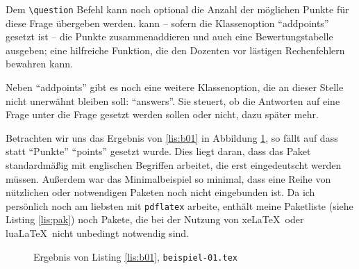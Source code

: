Dem  \texttt{\textbackslash question} Befehl kann noch optional die Anzahl der möglichen Punkte für diese Frage übergeben werden. 
 kann -- sofern die Klassenoption \enquote{addpoints} gesetzt ist -- die Punkte zusammenaddieren und auch eine Bewertungstabelle ausgeben; eine hilfreiche Funktion, die den Dozenten vor lästigen Rechenfehlern bewahren kann.

Neben \enquote{addpoints} gibt es noch eine weitere Klassenoption, die an dieser Stelle nicht unerwähnt bleiben soll: \enquote{answers}. Sie steuert, ob die Antworten auf eine Frage unter die Frage gesetzt werden sollen oder nicht, dazu später mehr.

Betrachten wir uns das Ergebnis von \ref{lis:b01} in Abbildung \ref{fig:b01}, so fällt auf dass statt \enquote{Punkte} \enquote{points} gesetzt wurde. 
Dies liegt daran, dass das Paket standardmäßig mit englischen Begriffen arbeitet, die erst eingedeutscht werden müssen. Außerdem war das Minimalbeispiel so minimal, dass eine Reihe von nützlichen oder notwendigen Paketen noch nicht eingebunden ist. 
Da ich persönlich noch am liebsten mit \texttt{pdflatex} arbeite, enthält meine Paketliste (siehe Listing \ref{lis:pak}) noch Pakete, die bei der Nutzung von xe\LaTeX\ oder lua\LaTeX\ nicht unbedingt notwendig sind.

\begin{figure}
\caption{Ergebnis von Listing \ref{lis:b01}, \texttt{beispiel-01.tex}}\label{fig:b01}
\end{figure}


